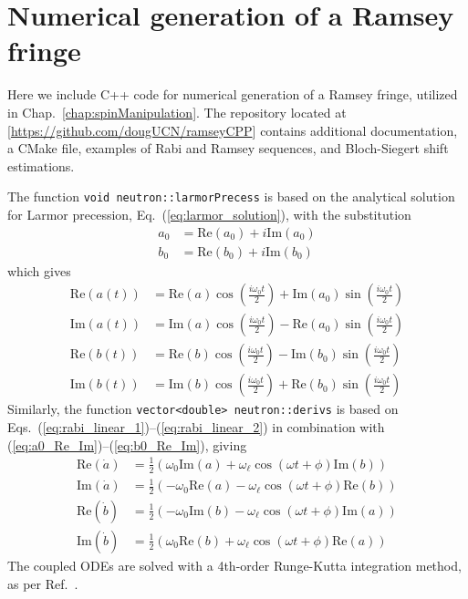 
\chapter{Numerical generation of a Ramsey fringe}\label{appx:ramsey_numerical}


Here we include C++ code for numerical generation of a Ramsey fringe, utilized in Chap.~\ref{chap:spinManipulation}. The repository located at [\url{https://github.com/dougUCN/ramseyCPP}] contains additional documentation, a CMake file, examples of Rabi and Ramsey sequences, and Bloch-Siegert shift estimations. 

The function \texttt{void neutron::larmorPrecess} is based on the analytical solution for Larmor precession, Eq.~(\ref{eq:larmor_solution}), with the substitution
%
\begin{align}
    a_0 &= \text{Re}(a_0)+i\text{Im}(a_0)\label{eq:a0_Re_Im}\\
    b_0 &= \text{Re}(b_0)+i\text{Im}(b_0)\label{eq:b0_Re_Im}
\end{align}
%
which gives 
%
\begin{align}
    \text{Re}(a(t)) &= \text{Re}(a)\cos\left(\frac{i\omega_0 t}{2}\right)+\text{Im}(a_0)\sin\left(\frac{i\omega_0 t}{2}\right)\\
    \text{Im}(a(t)) &= \text{Im}(a)\cos\left(\frac{i\omega_0 t}{2}\right)-\text{Re}(a_0)\sin\left(\frac{i\omega_0 t}{2}\right)\\
    \text{Re}(b(t)) &= \text{Re}(b)\cos\left(\frac{i\omega_0 t}{2}\right)-\text{Im}(b_0)\sin\left(\frac{i\omega_0 t}{2}\right)\\
    \text{Im}(b(t)) &= \text{Im}(b)\cos\left(\frac{i\omega_0 t}{2}\right)+\text{Re}(b_0)\sin\left(\frac{i\omega_0 t}{2}\right)
\end{align}
%
Similarly, the function \texttt{vector<double> neutron::derivs} is based on Eqs.~(\ref{eq:rabi_linear_1})--(\ref{eq:rabi_linear_2}) in combination with (\ref{eq:a0_Re_Im})--(\ref{eq:b0_Re_Im}), giving
%
\begin{align}
    \text{Re}(\dot{a}) &= \frac{1}{2}\left(\omega_0\text{Im}(a) +\omega_\ell\cos(\omega t +\phi)\text{Im}(b) \right) \\
    \text{Im}(\dot{a}) &= \frac{1}{2}\left(-\omega_0\text{Re}(a)-\omega_\ell\cos(\omega t+\phi)\text{Re}(b) \right) \\
    \text{Re}(\dot{b}) &= \frac{1}{2}\left(-\omega_0\text{Im}(b)-\omega_\ell\cos(\omega t+\phi)\text{Im}(a) \right) \\
    \text{Im}(\dot{b}) &= \frac{1}{2}\left(\omega_0\text{Re}(b) +\omega_\ell\cos(\omega t +\phi)\text{Re}(a) \right)
\end{align}
%
The coupled ODEs are solved with a 4th-order Runge-Kutta integration method, as per Ref.~\cite{numerical_recipes}.


